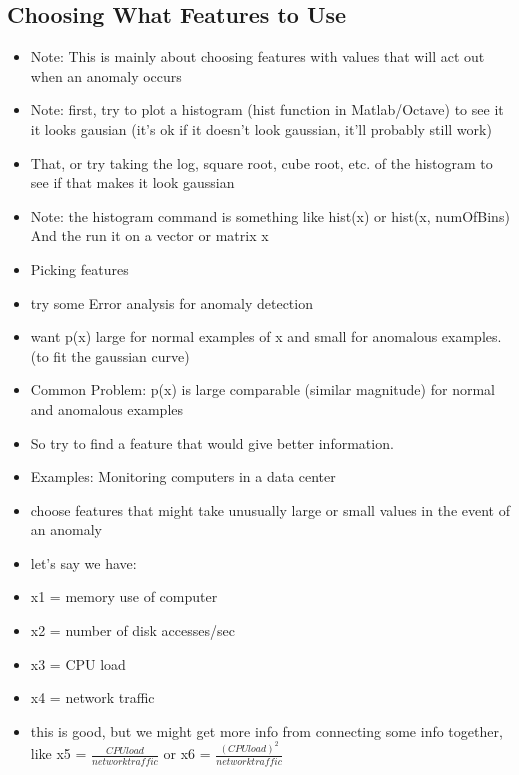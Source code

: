 \documentclass[]{article}
\begin{document}
	\subsection{Choosing What Features to Use}
		\begin{itemize}
			\item Note: This is mainly about choosing features with values that will act out when an anomaly occurs
			\item Note: first, try to plot a histogram (hist function in Matlab/Octave) to see it it looks gausian (it's ok if it doesn't look gaussian, it'll probably still work)
			\item That, or try taking the log, square root, cube root, etc. of the histogram to see if that makes it look gaussian
			\item Note: the histogram command is something like hist(x) or hist(x, numOfBins) And the run it on a vector or matrix x
			\\
			\item Picking features
			\item try some Error analysis for anomaly detection
			\item want p(x) large for normal examples of x and small for anomalous examples. (to fit the gaussian curve)
			\item Common Problem: p(x) is large comparable (similar magnitude) for normal and anomalous examples
			\item So try to find a feature that would give better information.
			\\
			\item Examples: Monitoring computers in a data center
			\item choose features that might take unusually large or small values in the event of an anomaly
			\item let's say we have:
			\item x1 = memory use of computer 
			\item x2 = number of disk accesses/sec
			\item x3 = CPU load
			\item x4 = network traffic
			\item this is good, but we might get more info from connecting some info together, like x5 = $\frac{CPU load}{network traffic}$ or x6 = $\frac{(CPU load)^2}{network traffic}$
		\end{itemize}
		
\end{document}
